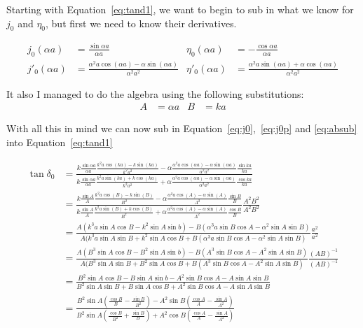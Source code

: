 \documentclass{jhwhw}
\begin{document}
\solution
Starting with Equation~\eqref{eq:tand1}, we want to begin to sub in what we know for $j_0$ and $\eta_0$, but first we need to know their derivatives.

\begin{align}
	\label{eq:j0}
	j_0(\alpha a) &= \frac{\sin{\alpha a}}{\alpha a} & 
	\eta_0(\alpha a)&= - \frac{\cos{\alpha a}}{\alpha a}
	 \\\label{eq:j0p}
	j'_0(\alpha a) &= \frac {\alpha^2 a \cos{(\alpha a)} - \alpha \sin{(\alpha a)}} {\alpha^2 a^2} & 
	\eta'_0(\alpha a) &= \frac {\alpha^2 a \sin{(\alpha a)} + \alpha \cos{(\alpha a)}} {\alpha^2 a^2}
\end{align}

It also I managed to do the algebra using the following substitutions:
\begin{align}
	\label{eq:absub}
	A &= \alpha a & B &= k a
\end{align}

With all this in mind we can now sub in Equation~\eqref{eq:j0},~\eqref{eq:j0p} and \eqref{eq:absub} into Equation~\eqref{eq:tand1}

\begin{align}
    \tan{\delta_0} &= 
	\frac 
	{k \frac{\sin{\alpha a}}{\alpha a} \frac {k^2 a \cos{(k a)} - k \sin{(k a)}} {k^2 a^2} - \alpha \frac {\alpha^2 a \cos{(\alpha a)} - \alpha \sin{(\alpha a)}} {\alpha^2 a^2} \frac{\sin{k a}}{k a}}
	{k \frac{\sin{\alpha a}}{\alpha a} \frac {k^2 a \sin{(k a)} + k \cos{(k a)}} {k^2 a^2}+\alpha \frac {\alpha^2 a \cos{(\alpha a)} - \alpha \sin{(\alpha a)}} {\alpha^2 a^2}\frac{\cos{ka}}{k a}} 
	\\
	&= \frac
	{k \frac{\sin{A}}{A} \frac {k^2 a \cos{(B)} - k \sin{(B)}} {B^2} - \alpha \frac {\alpha^2 a \cos{(A)} - \alpha \sin{(A)}} {A^2} \frac{\sin{B}}{B}}
	{k \frac{\sin{A}}{A} \frac {k^2 a \sin{(B)} + k \cos{(B)}} {B^2}+\alpha \frac {\alpha^2 a \cos{(A)} - \alpha \sin{(A)}} {A^2}\frac{\cos{B}}{B}} \frac{A^2 B^2}{A^2 B^2} 
	\\
	&= \frac
	{
	A(k^3 a \sin{A}\cos{B}- k^2 \sin{A}\sin{b})-B(\alpha^3 a \sin{B}\cos{A}-\alpha^2 \sin{A}\sin{B})
	}
	{
	A(k^3 a \sin{A}\sin{B}+k^2 \sin{A} \cos{B} + B(\alpha^3 a \sin{B}\cos{A}-\alpha^2 \sin{A}\sin{B})
	}\frac{a^2}{a^2}
	\\
	&= \frac
	{
	A(B^3 \sin{A}\cos{B}- B^2 \sin{A}\sin{b})-B(A^3 \sin{B}\cos{A}- A^2 \sin{A}\sin{B})
	}
	{
	A(B^3  \sin{A}\sin{B}+B^2 \sin{A} \cos{B} + B(A^3 \sin{B}\cos{A}-A^2 \sin{A}\sin{B})
	} \frac{(AB)^{-1}}{(AB)^{-1}}
	\\
	&= \frac
	{
	B^2 \sin{A}\cos{B}- B \sin{A}\sin{b} - A^2 \sin{B}\cos{A}- A \sin{A}\sin{B}
	}
	{
	B^2  \sin{A}\sin{B}+B \sin{A} \cos{B} + A^2 \sin{B}\cos{A}-A \sin{A}\sin{B}
	}
	\\
	&= \frac 
	{
	B^2 \sin{A} \left( \frac{\cos{B}}{B} - \frac {\sin{B}}{B^2} \right) - A^2 \sin{B} \left( \frac { \cos{A} } { A } - \frac {  \sin{A}  } {  A^2  } \right)
	}
	{
	B^2 \sin{A} \left( \frac{\cos{B}}{B^2} + \frac {\sin{B}}{B} \right) + A^2 \cos{B} \left( \frac { \cos{A} } { A } - \frac {  \sin{A}  } {  A^2  } \right)
	}
\end{align}
\end{document}
